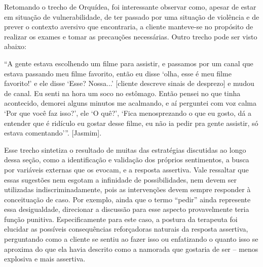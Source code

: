Retomando o trecho de Orquídea, foi interessante observar como, apesar de estar em situação de vulnerabilidade, de ter passado por uma situação de violência e de prever o contexto aversivo que encontraria, a cliente manteve-se no propósito de realizar os exames e tomar as precauções necessárias. Outro trecho pode ser visto abaixo:

``A gente estava escolhendo um filme para assistir, e passamos por um canal que estava passando meu filme favorito, então eu disse ‘olha, esse é meu filme favorito!’ e ele disse ‘Esse? Nossa...’ [cliente descreve sinais de desprezo] e mudou de canal. Eu senti na hora um soco no estômago. Então pensei no que tinha acontecido, demorei alguns minutos me acalmando, e aí perguntei com voz calma ‘Por que você faz isso?’, ele ‘O quê?’, ‘Fica menosprezando o que eu gosto, dá a entender que é ridículo eu gostar desse filme, eu não ia pedir pra gente assistir, só estava comentando’''. [Jasmim].

Esse trecho sintetiza o resultado de muitas das estratégias discutidas ao longo dessa seção, como a identificação e validação dos próprios sentimentos, a busca por variáveis externas que os evocam, e a resposta assertiva. Vale ressaltar que essas sugestões nem esgotam a infinidade de possibilidades, nem devem ser utilizadas indiscriminadamente, pois as intervenções devem sempre responder à conceituação de caso. Por exemplo, ainda que o termo ``pedir'' ainda represente essa desigualdade, direcionar a discussão para esse aspecto provavelmente teria função punitiva. Especificamente para este caso, a postura da terapeuta foi elucidar as possíveis consequências reforçadoras naturais da resposta assertiva, perguntando como a cliente se sentiu ao fazer isso ou enfatizando o quanto isso se aproxima do que ela havia descrito como a namorada que gostaria de ser – menos explosiva e mais assertiva.


